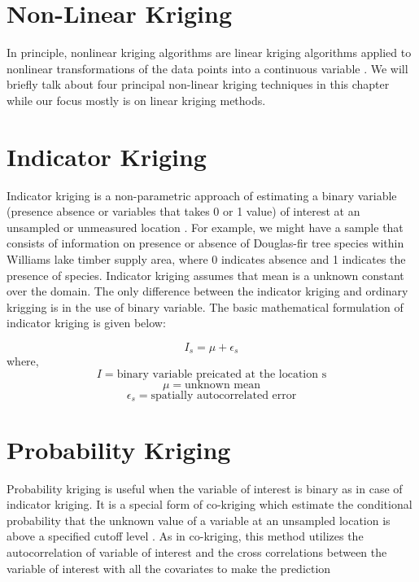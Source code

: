\documentclass[
]{book}
\begin{document}
\hypertarget{non-linear-kriging}{%
\section{Non-Linear Kriging}\label{non-linear-kriging}}

In principle, nonlinear kriging algorithms are linear kriging algorithms applied to nonlinear transformations of the data points into a continuous variable \citep{deutsch_gslib_1993}. We will briefly talk about four principal non-linear kriging techniques in this chapter while our focus mostly is on linear kriging methods.

\hypertarget{indicator-kriging}{%
\section{Indicator Kriging}\label{indicator-kriging}}

Indicator kriging is a non-parametric approach of estimating a binary variable (presence absence or variables that takes 0 or 1 value) of interest at an unsampled or unmeasured location \citep{journel_nonparametric_1983}. For example, we might have a sample that consists of information on presence or absence of Douglas-fir tree species within Williams lake timber supply area, where 0 indicates absence and 1 indicates the presence of species. Indicator kriging assumes that mean is a unknown constant over the domain. The only difference between the indicator kriging and ordinary krigging is in the use of binary variable. The basic mathematical formulation of indicator kriging is given below:

\[I_{s}= \mu + \epsilon_{s}\]
where, \[I= \text{binary variable preicated at the location s}\]
\[\mu= \text{unknown mean}\]
\[\epsilon_{s}=\text{spatially autocorrelated error}\]

\hypertarget{probability-kriging}{%
\section{Probability Kriging}\label{probability-kriging}}

Probability kriging is useful when the variable of interest is binary as in case of indicator kriging. It is a special form of co-kriging which estimate the conditional probability that the unknown value of a variable at an unsampled location is above a specified cutoff level \citep{carr_general_1993}. As in co-kriging, this method utilizes the autocorrelation of variable of interest and the cross correlations between the variable of interest with all the covariates to make the prediction \citep{carr_general_1993}
\end{document}
